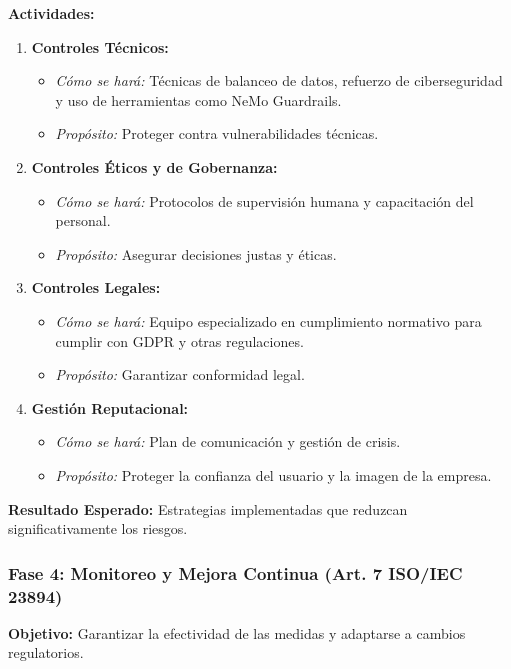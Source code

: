 \documentclass[12pt]{article}
\begin{document}
\textbf{Actividades:}
\begin{enumerate}
    \item \textbf{Controles Técnicos:}
        \begin{itemize}
            \item \textit{Cómo se hará:} Técnicas de balanceo de datos, refuerzo de ciberseguridad y uso de herramientas como NeMo Guardrails.
            \item \textit{Propósito:} Proteger contra vulnerabilidades técnicas.
        \end{itemize}
    \item \textbf{Controles Éticos y de Gobernanza:}
        \begin{itemize}
            \item \textit{Cómo se hará:} Protocolos de supervisión humana y capacitación del personal.
            \item \textit{Propósito:} Asegurar decisiones justas y éticas.
        \end{itemize}
    \item \textbf{Controles Legales:}
        \begin{itemize}
            \item \textit{Cómo se hará:} Equipo especializado en cumplimiento normativo para cumplir con GDPR y otras regulaciones.
            \item \textit{Propósito:} Garantizar conformidad legal.
        \end{itemize}
    \item \textbf{Gestión Reputacional:}
        \begin{itemize}
            \item \textit{Cómo se hará:} Plan de comunicación y gestión de crisis.
            \item \textit{Propósito:} Proteger la confianza del usuario y la imagen de la empresa.
        \end{itemize}
\end{enumerate}

\textbf{Resultado Esperado:} Estrategias implementadas que reduzcan significativamente los riesgos.

\subsubsection{Fase 4: Monitoreo y Mejora Continua (Art. 7 ISO/IEC 23894)}
\textbf{Objetivo:} Garantizar la efectividad de las medidas y adaptarse a cambios regulatorios.
\end{document}
